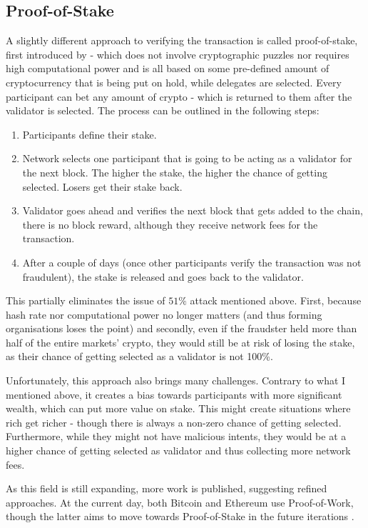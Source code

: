 \subsection{Proof-of-Stake}
A slightly different approach to verifying the transaction is called proof-of-stake, first introduced by \cite{king2012ppcoin} - which does not involve cryptographic puzzles nor requires high computational power and is all based on some pre-defined amount of cryptocurrency that is being put on hold, while delegates are selected. Every participant can bet any amount of crypto - which is returned to them after the validator is selected. The process can be outlined in the following steps:
\begin{enumerate}
    \item Participants define their stake.
    \item Network selects one participant that is going to be acting as a validator for the next block. The higher the stake, the higher the chance of getting selected. Losers get their stake back.
    \item Validator goes ahead and verifies the next block that gets added to the chain, there is no block reward, although they receive network fees for the transaction.
    \item After a couple of days (once other participants verify the transaction was not fraudulent), the stake is released and goes back to the validator.
\end{enumerate}
This partially eliminates the issue of $51\%$ attack mentioned above. First, because hash rate nor computational power no longer matters (and thus forming organisations loses the point) and secondly, even if the fraudster held more than half of the entire markets' crypto, they would still be at risk of losing the stake, as their chance of getting selected as a validator is not 100\%.

Unfortunately, this approach also brings many challenges. Contrary to what I mentioned above, it creates a bias towards participants with more significant wealth, which can put more value on stake. This might create situations where rich get richer - though there is always a non-zero chance of getting selected. Furthermore, while they might not have malicious intents, they would be at a higher chance of getting selected as validator and thus collecting more network fees.

As this field is still expanding, more work is published, suggesting refined approaches. At the current day, both Bitcoin and Ethereum use Proof-of-Work, though the latter aims to move towards Proof-of-Stake in the future iterations \cite{saleh2020blockchain}.
